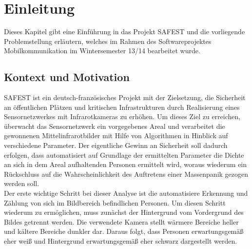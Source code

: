 \section{Einleitung}
\label{chap:einleitung}

Dieses Kapitel gibt eine Einführung in das Projekt SAFEST und die vorliegende Problemstellung erläutern, welches im Rahmen des Softwareprojektes Mobilkommunikation im Wintersemester 13/14 bearbeitet wurde.


\subsection{Kontext und Motivation}
\label{sec:motivation}

SAFEST ist ein deutsch-französisches Projekt mit der Zielsetzung, die Sicherheit an öffentlichen Plätzen und kritischen Infrastrukturen durch Realisierung eines Sensornetzwerkes mit Infrarotkameras zu erhöhen.
 Um dieses Ziel zu erreichen, überwacht das Sensornetzwerk ein vorgegebenes Areal und verarbeitet die gewonnenen Mittelinfrarotbilder mit Hilfe von Algorithmen in Hinblick auf verschiedene Parameter.
 Der eigentliche Gewinn an Sicherheit soll dadurch erfolgen, dass automatisiert auf Grundlage der ermittelten Parameter die Dichte an sich in dem Areal aufhaltenden Personen ermittelt wird, woraus wiederum ein Rückschluss auf die Wahrscheinlichkeit des Auftretens einer Massenpanik gezogen werden soll.\\
Der erste wichtige Schritt bei dieser Analyse ist die automatisiere Erkennung und Zählung von sich im Bildbereich befindlichen Personen.
 Um diesen Schritt wiederum zu ermöglichen, muss zunächst der Hintergrund vom Vordergrund des Bildes getrennt werden.
Die verwendete Kamera stellt wärmere Bereiche heller und kältere Bereiche dunkler dar. Daraus folgt, dass Personen erwartungsgemäß eher weiß und Hintergrund erwartungsgemäß eher schwarz dargestellt werden.
